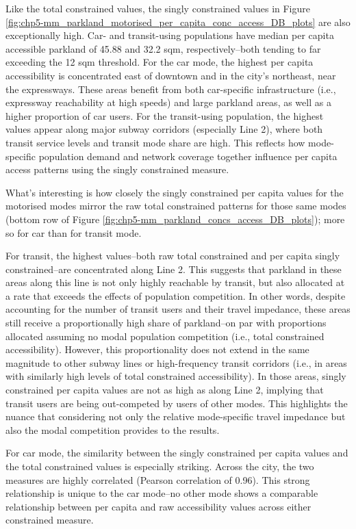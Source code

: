 \documentclass[
11pt, %
oneside, %
english, %
singlespacing, %
]{macthesis} %
\begin{document}
Like the total constrained values, the singly constrained values in Figure \ref{fig:chp5-mm_parkland_motorised_per_capita_conc_access_DB_plots} are also exceptionally high. Car- and transit-using populations have median per capita accessible parkland of 45.88 and 32.2 sqm, respectively--both tending to far exceeding the 12 sqm threshold. For the car mode, the highest per capita accessibility is concentrated east of downtown and in the city's northeast, near the expressways. These areas benefit from both car-specific infrastructure (i.e., expressway reachability at high speeds) and large parkland areas, as well as a higher proportion of car users. For the transit-using population, the highest values appear along major subway corridors (especially Line 2), where both transit service levels and transit mode share are high. This reflects how mode-specific population demand and network coverage together influence per capita access patterns using the singly constrained measure.

What's interesting is how closely the singly constrained per capita values for the motorised modes mirror the raw total constrained patterns for those same modes (bottom row of Figure \ref{fig:chp5-mm_parkland_concs_access_DB_plots}); more so for car than for transit mode.

For transit, the highest values--both raw total constrained and per capita singly constrained--are concentrated along Line 2. This suggests that parkland in these areas along this line is not only highly reachable by transit, but also allocated at a rate that exceeds the effects of population competition. In other words, despite accounting for the number of transit users and their travel impedance, these areas still receive a proportionally high share of parkland--on par with proportions allocated assuming no modal population competition (i.e., total constrained accessibility). However, this proportionality does not extend in the same magnitude to other subway lines or high-frequency transit corridors (i.e., in areas with similarly high levels of total constrained accessibility). In those areas, singly constrained per capita values are not as high as along Line 2, implying that transit users are being out-competed by users of other modes. This highlights the nuance that considering not only the relative mode-specific travel impedance but also the modal competition provides to the results.

For car mode, the similarity between the singly constrained per capita values and the total constrained values is especially striking. Across the city, the two measures are highly correlated (Pearson correlation of 0.96). This strong relationship is unique to the car mode--no other mode shows a comparable relationship between per capita and raw accessibility values across either constrained measure.
\end{document}
